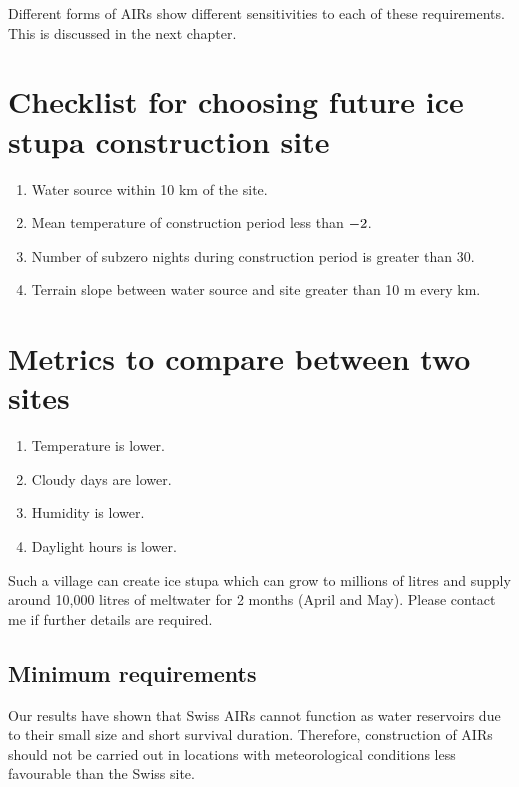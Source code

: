 Different forms of AIRs show different sensitivities to each of these requirements. This is discussed in the
next chapter.

\section{ Checklist for choosing future ice stupa construction site }

\begin{enumerate}

  \item Water source within 10 km of the site.
  \item Mean temperature of construction period less than $- 2 \degree C $.
  \item Number of subzero nights during construction period is greater than 30.
  \item Terrain slope between water source and site greater than 10 m every km. 

\end{enumerate}

\section{ Metrics to compare between two sites}

\begin{enumerate}

  \item Temperature is lower.
  \item Cloudy days are lower.
  \item Humidity is lower.
  \item Daylight hours is lower.

\end{enumerate}

Such a village can create ice stupa which can grow to millions of litres and supply around 10,000 litres of meltwater for 2 months (April and May). Please contact me if further details are required.



\subsection{Minimum requirements}

Our results have shown that Swiss AIRs cannot function as water reservoirs due to their small size and short
survival duration. Therefore, construction of AIRs should not be carried out in locations with meteorological
conditions less favourable than the Swiss site.

